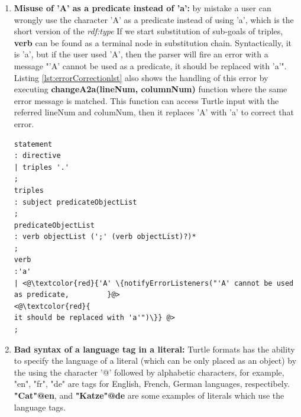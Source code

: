 \begin{enumerate}
\begin{lstlisting}[language=java, label=lst:errorCorrectionlst,  caption={Java-based handling for error recovery based on the error message in Error Correction Module.}] 
while (iterator.hasNext()) {
String line = iterator.next();
// select the action based on the error message
if (line.contains("Missing '.' at the end of Prefix
directive")||line.contains("Missing '.' at the end 
of a triple"))
<@\textcolor{violet}{addDot(lineNum, columnNum);}@>
else if (line.contains("'A' cannot be used as
predicate, it should be repalced with 'a'"))
<@\textcolor{violet}{changeA2a(lineNum, columnNum);}@>
}
\end{lstlisting}

\item \textbf{Misuse of 'A' as a predicate instead of 'a':} by mistake a user can wrongly use the character 'A' as a predicate instead of using 'a', which is the short version of the \emph{rdf:type}
If we start substitution of sub-goals of triples, \textbf{verb} can be found as a terminal node in  substitution chain. 
Syntactically, it is 'a', but if the user used 'A', then the parser will fire an error with a message "’A’ cannot be used as a predicate, it should be replaced with ’a’".
Listing \ref{lst:errorCorrectionlst} also shows the handling of this error by executing \textbf{changeA2a(lineNum, columnNum)} function where the same error message is matched. 
This function can access Turtle input with the referred lineNum and columNum, then it replaces 'A' with 'a' to correct that error. 

\begin{lstlisting}[label=lst:MissuseAex ,  caption={The grammar rule for detecting the misuse of 'A' as a predicate instead of 'a' in the grammar.}] 
statement
: directive
| triples '.'
;
triples
: subject predicateObjectList
;
predicateObjectList
: verb objectList (';' (verb objectList)?)*
;
verb
:'a'
| <@\textcolor{red}{'A' \{notifyErrorListeners("'A' cannot be used as predicate,         }@> 
<@\textcolor{red}{
it should be replaced with 'a'")\}} @>
;
\end{lstlisting}

\item \textbf{Bad syntax of a language tag in a literal:} 
Turtle formats has the ability to specify the language of a literal (which can be only placed as an object) by the using the character '@' followed by alphabetic characters, for example, "en", "fr", "de" are tags for English, French, German languages, respectibely. 
\textbf{"Cat"@en}, and \textbf{"Katze"@de} are some examples of literals which use the language tags.



\end{enumerate}
